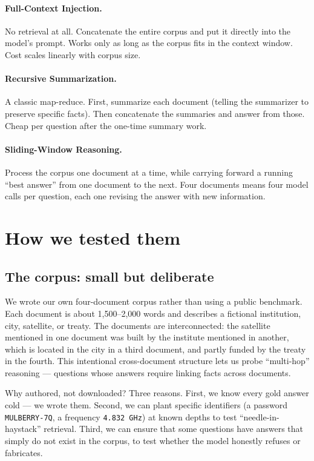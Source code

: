\documentclass[11pt,a4paper]{article}
\begin{document}
\paragraph{Full-Context Injection.} No retrieval at all. Concatenate the entire corpus and put it directly into the model's prompt. Works only as long as the corpus fits in the context window. Cost scales linearly with corpus size.

\paragraph{Recursive Summarization.} A classic map-reduce. First, summarize each document (telling the summarizer to preserve specific facts). Then concatenate the summaries and answer from those. Cheap per question after the one-time summary work.

\paragraph{Sliding-Window Reasoning.} Process the corpus one document at a time, while carrying forward a running ``best answer'' from one document to the next. Four documents means four model calls per question, each one revising the answer with new information.

\section{How we tested them}

\subsection{The corpus: small but deliberate}

We wrote our own four-document corpus rather than using a public benchmark. Each document is about 1{,}500--2{,}000 words and describes a fictional institution, city, satellite, or treaty. The documents are interconnected: the satellite mentioned in one document was built by the institute mentioned in another, which is located in the city in a third document, and partly funded by the treaty in the fourth. This intentional cross-document structure lets us probe ``multi-hop'' reasoning — questions whose answers require linking facts across documents.

Why authored, not downloaded? Three reasons. First, we know every gold answer cold — we wrote them. Second, we can plant specific identifiers (a password \texttt{MULBERRY-7Q}, a frequency \texttt{4.832~GHz}) at known depths to test ``needle-in-haystack'' retrieval. Third, we can ensure that some questions have answers that simply do not exist in the corpus, to test whether the model honestly refuses or fabricates.
\end{document}
